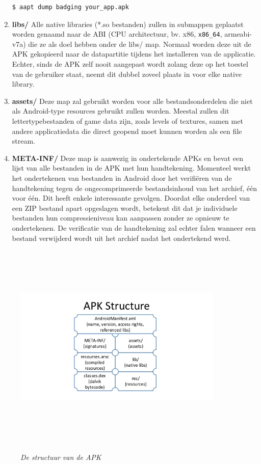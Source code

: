 \begin{enumerate}
	\begin{lstlisting}[backgroundcolor = \color{lightgray}, xleftmargin = 2cm,
	framexleftmargin = 1em]
	$ aapt dump badging your_app.apk
	\end{lstlisting}
	\item \textbf{libs/}\newline
	Alle native libraries (*.so bestanden) zullen in submappen geplaatst worden genaamd naar de ABI (CPU architectuur, bv. x86, \texttt{x86\_64}, armeabi-v7a) die ze als doel hebben onder de libs/ map. Normaal worden deze uit de APK gekopieerd naar de datapartitie tijdens het installeren van de applicatie. Echter, sinds de APK zelf nooit aangepast wordt zolang deze op het toestel van de gebruiker staat, neemt dit dubbel zoveel plaats in voor elke native library. 
	\item \textbf{assets/}\newline
	Deze map zal gebruikt worden voor alle bestandsonderdelen die niet als Android-type resources gebruikt zullen worden. Meestal zullen dit lettertypebestanden of game data zijn, zoals levels of textures, samen met andere applicatiedata die direct geopend moet kunnen worden als een file stream.
	\item \textbf{META-INF/}\newline
	Deze map is aanwezig in ondertekende APKs en bevat een lijst van alle bestanden in de APK met hun handtekening. Momenteel werkt het ondertekenen van bestanden in Android door het verifiëren van de handtekening tegen de ongecomprimeerde bestandsinhoud van het archief, één voor één. Dit heeft enkele interessante gevolgen. Doordat elke onderdeel van een ZIP bestand apart opgeslagen wordt, betekent dit dat je individuele bestanden hun compressieniveau kan aanpassen zonder ze opnieuw te ondertekenen. De verificatie van de handtekening zal echter falen wanneer een bestand verwijderd wordt uit het archief nadat het ondertekend werd. 
\end{enumerate}

\begin{figure}[H]
	\centering
	\caption{\textit{De structuur van de APK}}
	\includegraphics[width=10cm, height=10cm, keepaspectratio]{img/ApkStructure}\\[.5cm]
	
\end{figure}
